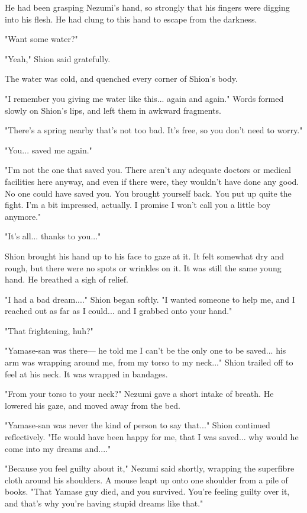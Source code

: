 He had been grasping Nezumi's hand, so strongly that his fingers were
digging into his flesh. He had clung to this hand to escape from the
darkness.

"Want some water?"

"Yeah," Shion said gratefully.

The water was cold, and quenched every corner of Shion's body.

"I remember you giving me water like this... again and again." Words
formed slowly on Shion's lips, and left them in awkward fragments.

"There's a spring nearby that's not too bad. It's free, so you don't
need to worry."

"You... saved me again."

"I'm not the one that saved you. There aren't any adequate doctors or
medical facilities here anyway, and even if there were, they wouldn't
have done any good. No one could have saved you. You brought yourself
back. You put up quite the fight. I'm a bit impressed, actually. I
promise I won't call you a little boy anymore."

"It's all... thanks to you..."

Shion brought his hand up to his face to gaze at it. It felt somewhat
dry and rough, but there were no spots or wrinkles on it. It was still
the same young hand. He breathed a sigh of relief.

"I had a bad dream...." Shion began softly. "I wanted someone to help
me, and I reached out as far as I could... and I grabbed onto your
hand."

"That frightening, huh?"

"Yamase-san was there--- he told me I can't be the only one to be saved...
his arm was wrapping around me, from my torso to my neck..." Shion
trailed off to feel at his neck. It was wrapped in bandages.

"From your torso to your neck?" Nezumi gave a short intake of breath. He
lowered his gaze, and moved away from the bed.

"Yamase-san was never the kind of person to say that..." Shion continued
reflectively. "He would have been happy for me, that I was saved... why
would he come into my dreams and...."

"Because you feel guilty about it," Nezumi said shortly, wrapping the
superfibre cloth around his shoulders. A mouse leapt up onto one
shoulder from a pile of books. "That Yamase guy died, and you survived.
You're feeling guilty over it, and that's why you're having stupid
dreams like that."

